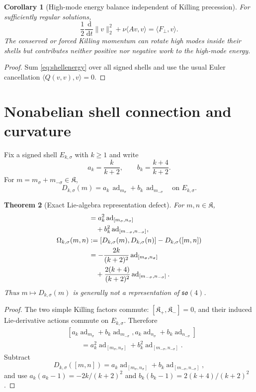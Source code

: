 \documentclass[
 aps,
 prd,
 reprint,
 amsmath,
 amssymb,
 nofootinbib,
 superscriptaddress
]{revtex4-2}
\newtheorem{theorem}{Theorem}[section]
\newtheorem{corollary}[theorem]{Corollary}
\theoremstyle{definition}
\theoremstyle{remark}
\newcommand{\cK}{\mathfrak K}
\newcommand{\ad}{\operatorname{ad}}
\newcommand{\dd}{\,\mathrm d}
\begin{document}
\begin{corollary}[High-mode energy balance independent of Killing precession]
\label{cor:highenergy}
For sufficiently regular solutions,
\begin{equation}
 \boxed{
 \frac12\frac{\dd}{\dd t}\|v\|_2^2
 +\nu\langle Av,v\rangle
 =
 \langle F_\perp,v\rangle.
 }
 \label{eq:highenergy}
\end{equation}
The conserved or forced Killing momentum can rotate high modes inside their
shells but contributes neither positive nor negative work to the high-mode
energy.
\end{corollary}

\begin{proof}
Sum \eqref{eq:shellenergy} over all signed shells and use the usual
Euler cancellation $\langle Q(v,v),v\rangle=0$.
\end{proof}




\section{Nonabelian shell connection and curvature}
\label{sec:holonomy}

Fix a signed shell $E_{k,\sigma}$ with $k\ge1$ and write
\[
 a_k=\frac{k}{k+2},
 \qquad
 b_k=\frac{k+4}{k+2}.
\]
For $m=m_\sigma+m_{-\sigma}\in\cK$,
\[
 D_{k,\sigma}(m)
 =
 a_k\,\ad_{m_\sigma}
 +
 b_k\,\ad_{m_{-\sigma}}
 \quad\text{on }E_{k,\sigma}.
\]

\begin{theorem}[Exact Lie-algebra representation defect]
\label{thm:representationdefect}
For $m,n\in\cK$,
\begin{align}
 [D_{k,\sigma}(m),D_{k,\sigma}(n)]
 &=
 a_k^2\ad_{[m_\sigma,n_\sigma]}
 \notag\\
 &\quad+
 b_k^2\ad_{[m_{-\sigma},n_{-\sigma}]},
 \label{eq:DcommD}\\
 \Omega_{k,\sigma}(m,n)
 &:=
 [D_{k,\sigma}(m),D_{k,\sigma}(n)]
 -
 D_{k,\sigma}([m,n])
 \notag\\
 &=
 -\frac{2k}{(k+2)^2}\ad_{[m_\sigma,n_\sigma]}
 \notag\\
 &\quad+
 \frac{2(k+4)}{(k+2)^2}
 \ad_{[m_{-\sigma},n_{-\sigma}]}.
 \label{eq:Omega}
\end{align}
Thus $m\mapsto D_{k,\sigma}(m)$ is generally not a representation of
$\mathfrak{so}(4)$.
\end{theorem}

\begin{proof}
The two simple Killing factors commute:
$[\cK_+,\cK_-]=0$, and their induced Lie-derivative actions commute on
$E_{k,\sigma}$.  Therefore
\[
\begin{aligned}
 &[a_k\ad_{m_\sigma}+b_k\ad_{m_{-\sigma}},
   a_k\ad_{n_\sigma}+b_k\ad_{n_{-\sigma}}]\\
 &\qquad=
 a_k^2\ad_{[m_\sigma,n_\sigma]}
 +
 b_k^2\ad_{[m_{-\sigma},n_{-\sigma}]}.
\end{aligned}
\]
Subtract
\[
 D_{k,\sigma}([m,n])
 =
 a_k\ad_{[m_\sigma,n_\sigma]}
 +
 b_k\ad_{[m_{-\sigma},n_{-\sigma}]},
\]
and use
$a_k(a_k-1)=-2k/(k+2)^2$ and
$b_k(b_k-1)=2(k+4)/(k+2)^2$.
\end{proof}
\end{document}
